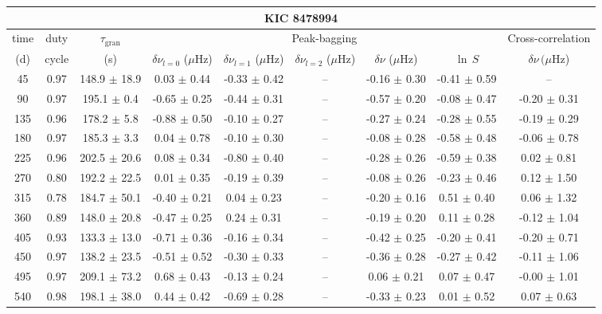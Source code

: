 \documentclass[twocolumn]{aastex61}%
\begin{document}
\begin{table*}[ht]\centering\fontsize{9.}{7.}\selectfont
\begin{tabular}{ccc|ccccc|c}
\multicolumn{9}{c}{KIC 8478994}\\ \hline\hline
time & duty & $\tau_\text{gran}$ &\multicolumn{5}{c|}{Peak-bagging}&Cross-correlation\\
(d)& cycle & (s)&$\delta\nu_{l=0}$ ($\mu$Hz) & $\delta\nu_{l=1}$ ($\mu$Hz) & $\delta\nu_{l=2}$ ($\mu$Hz) & $\delta\nu$ ($\mu$Hz)& $\ln\,S$ & $\delta\nu\,(\mu$Hz)\\\hline
45 & 0.97 & 148.9 $\pm$ 18.9 & 0.03 $\pm$ 0.44 & -0.33 $\pm$ 0.42 & -- & -0.16 $\pm$ 0.30 & -0.41 $\pm$ 0.59 & --\\
90 & 0.97 & 195.1 $\pm$ 0.4 & -0.65 $\pm$ 0.25 & -0.44 $\pm$ 0.31 & -- & -0.57 $\pm$ 0.20 & -0.08 $\pm$ 0.47 & -0.20 $\pm$ 0.31\\
135 & 0.96 & 178.2 $\pm$ 5.8 & -0.88 $\pm$ 0.50 & -0.10 $\pm$ 0.27 & -- & -0.27 $\pm$ 0.24 & -0.28 $\pm$ 0.55 & -0.19 $\pm$ 0.29\\
180 & 0.97 & 185.3 $\pm$ 3.3 & 0.04 $\pm$ 0.78 & -0.10 $\pm$ 0.30 & -- & -0.08 $\pm$ 0.28 & -0.58 $\pm$ 0.48 & -0.06 $\pm$ 0.78\\
225 & 0.96 & 202.5 $\pm$ 20.6 & 0.08 $\pm$ 0.34 & -0.80 $\pm$ 0.40 & -- & -0.28 $\pm$ 0.26 & -0.59 $\pm$ 0.38 & 0.02 $\pm$ 0.81\\
270 & 0.80 & 192.2 $\pm$ 22.5 & 0.01 $\pm$ 0.35 & -0.19 $\pm$ 0.39 & -- & -0.08 $\pm$ 0.26 & -0.23 $\pm$ 0.46 & 0.12 $\pm$ 1.50\\
315 & 0.78 & 184.7 $\pm$ 50.1 & -0.40 $\pm$ 0.21 & 0.04 $\pm$ 0.23 & -- & -0.20 $\pm$ 0.16 & 0.51 $\pm$ 0.40 & 0.06 $\pm$ 1.32\\
360 & 0.89 & 148.0 $\pm$ 20.8 & -0.47 $\pm$ 0.25 & 0.24 $\pm$ 0.31 & -- & -0.19 $\pm$ 0.20 & 0.11 $\pm$ 0.28 & -0.12 $\pm$ 1.04\\
405 & 0.93 & 133.3 $\pm$ 13.0 & -0.71 $\pm$ 0.36 & -0.16 $\pm$ 0.34 & -- & -0.42 $\pm$ 0.25 & -0.20 $\pm$ 0.41 & -0.20 $\pm$ 0.71\\
450 & 0.97 & 138.2 $\pm$ 23.5 & -0.51 $\pm$ 0.52 & -0.30 $\pm$ 0.33 & -- & -0.36 $\pm$ 0.28 & -0.27 $\pm$ 0.42 & -0.11 $\pm$ 1.06\\
495 & 0.97 & 209.1 $\pm$ 73.2 & 0.68 $\pm$ 0.43 & -0.13 $\pm$ 0.24 & -- & 0.06 $\pm$ 0.21 & 0.07 $\pm$ 0.47 & -0.00 $\pm$ 1.01\\
540 & 0.98 & 198.1 $\pm$ 38.0 & 0.44 $\pm$ 0.42 & -0.69 $\pm$ 0.28 & -- & -0.33 $\pm$ 0.23 & 0.01 $\pm$ 0.52 & 0.07 $\pm$ 0.63\\

\end{tabular}
\end{table*}
\end{document}
